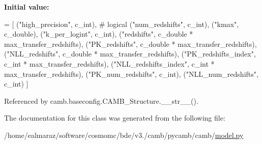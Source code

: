 {\bfseries Initial value\+:}
\begin{DoxyCode}
=  [
        (\textcolor{stringliteral}{"high\_precision"}, c\_int),  \textcolor{comment}{# logical}
        (\textcolor{stringliteral}{"num\_redshifts"}, c\_int),
        (\textcolor{stringliteral}{"kmax"}, c\_double),
        (\textcolor{stringliteral}{"k\_per\_logint"}, c\_int),
        (\textcolor{stringliteral}{"redshifts"}, c\_double * max\_transfer\_redshifts),
        (\textcolor{stringliteral}{"PK\_redshifts"}, c\_double * max\_transfer\_redshifts),
        (\textcolor{stringliteral}{"NLL\_redshifts"}, c\_double * max\_transfer\_redshifts),
        (\textcolor{stringliteral}{"PK\_redshifts\_index"}, c\_int * max\_transfer\_redshifts),
        (\textcolor{stringliteral}{"NLL\_redshifts\_index"}, c\_int * max\_transfer\_redshifts),
        (\textcolor{stringliteral}{"PK\_num\_redshifts"}, c\_int),
        (\textcolor{stringliteral}{"NLL\_num\_redshifts"}, c\_int)
    ]
\end{DoxyCode}


Referenced by camb.\+baseconfig.\+C\+A\+M\+B\+\_\+\+Structure.\+\_\+\+\_\+str\+\_\+\+\_\+().



The documentation for this class was generated from the following file\+:\begin{DoxyCompactItemize}
\item 
/home/ealmaraz/software/cosmomc/bde/v3./camb/pycamb/camb/\mbox{\hyperlink{model_8py}{model.\+py}}\end{DoxyCompactItemize}
